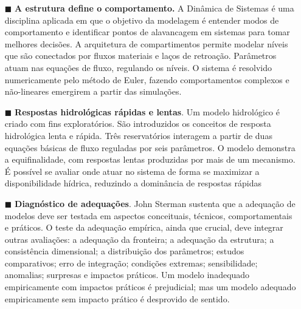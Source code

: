 \documentclass[./main.tex]{subfiles}
\begin{document}
\begin{itemize}
    \item[$\blacksquare$] \textbf{A estrutura define o comportamento.} A Dinâmica de Sistemas é uma disciplina aplicada em que o objetivo da modelagem é entender modos de comportamento e identificar pontos de alavancagem em sistemas para tomar melhores decisões. A arquitetura de compartimentos permite modelar níveis que são conectados por fluxos materiais e laços de retroação. Parâmetros atuam nas equações de fluxo, regulando os níveis. O sistema é resolvido numericamente pelo método de Euler, fazendo comportamentos complexos e não-lineares emergirem a partir das simulações.    
    \item[$\blacksquare$] \textbf{Respostas hidrológicas rápidas e lentas}. Um modelo hidrológico é criado com fins exploratórios. São introduzidos os conceitos de resposta hidrológica lenta e rápida. Três reservatórios interagem a partir de duas equações básicas de fluxo reguladas por seis parâmetros. O modelo demonstra a equifinalidade, com respostas lentas produzidas por mais de um mecanismo. É possível se avaliar onde atuar no sistema de forma se maximizar a disponibilidade hídrica, reduzindo a dominância de respostas rápidas
    
    \item[$\blacksquare$] \textbf{Diagnóstico de adequações}. John Sterman sustenta que a adequação de modelos deve ser testada em aspectos conceituais, técnicos, comportamentais e práticos. O teste da adequação empírica, ainda que crucial, deve integrar outras avaliações: a adequação da fronteira; a adequação da estrutura; a consistência dimensional; a distribuição dos parâmetros; estudos comparativos; erro de integração; condições extremas; sensibilidade; anomalias; surpresas e impactos práticos. Um modelo inadequado empiricamente com impactos práticos é prejudicial; mas um modelo adequado empiricamente sem impacto prático é desprovido de sentido.
    
\end{itemize}
\end{document}
